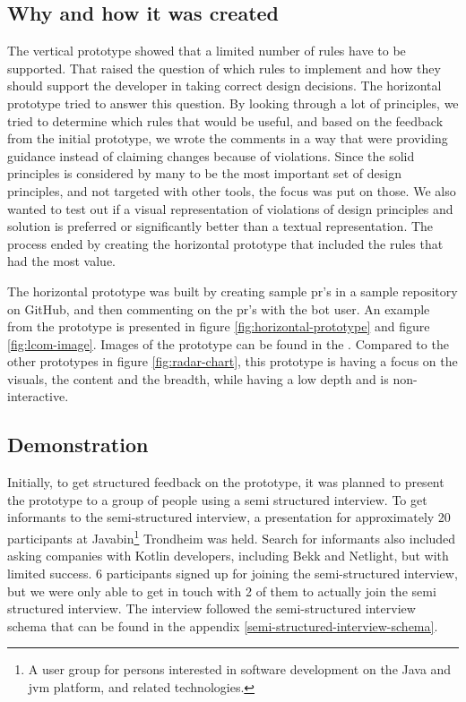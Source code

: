\documentclass[pdftex,10pt,b5paper,twoside]{report}
\begin{document}
\subsection*{Why and how it was created}
The vertical prototype showed that a limited number of rules have to be supported. That raised the question of which rules to implement and how they should support the developer in taking correct design decisions. The horizontal prototype tried to answer this question. By looking through a lot of principles, we tried to determine which rules that would be useful, and based on the feedback from the initial prototype, we wrote the comments in a way that were providing guidance instead of claiming changes because of violations. Since the \gls{solid} principles is considered by many to be the most important set of design principles, and not targeted with other tools, the focus was put on those. We also wanted to test out if a visual representation of violations of design principles and solution is preferred or significantly better than a textual representation. The process ended by creating the horizontal prototype that included the rules that had the most value. 

The horizontal prototype was built by creating sample \gls{pr}'s in a sample repository on GitHub, and then commenting on the \gls{pr}'s with the bot user. An example from the prototype is presented in figure \ref{fig:horizontal-prototype} and figure \ref{fig:lcom-image}. Images of the prototype can be found in the \cite{sample-repository}. Compared to the other prototypes in figure \ref{fig:radar-chart}, this prototype is having a focus on the visuals, the content and the breadth, while having a low depth and is non-interactive.

\subsection*{Demonstration}
Initially, to get structured feedback on the prototype, it was planned to present the prototype to a group of people using a semi structured interview. To get informants to the semi-structured interview, a presentation for approximately 20 participants at Javabin\footnote{A user group for persons interested in software development on the Java and \gls{jvm} platform, and related technologies.} Trondheim was held. Search for informants also included asking companies with Kotlin developers, including Bekk and Netlight, but with limited success. 6 participants signed up for joining the semi-structured interview, but we were only able to get in touch with 2 of them to actually join the semi structured interview. The interview followed the semi-structured interview schema that can be found in the appendix \ref{semi-structured-interview-schema}.
\end{document}

